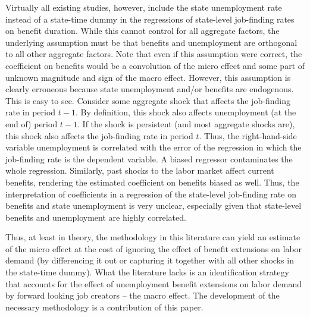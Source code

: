 \documentclass[12pt]{article}
\newcommand{\1}{\mathbf{1}}
\begin{document}
\begin{appendix}
Virtually all existing studies, however, include the state unemployment rate instead of a state-time dummy in the regressions of state-level job-finding rates on benefit duration. While this cannot control for all aggregate factors, the underlying assumption must be that benefits and unemployment are orthogonal to all other aggregate factors. Note that even if this assumption were correct, the coefficient on benefits would be a convolution of the micro effect and some part of unknown magnitude and sign of the macro effect. However, this assumption is clearly erroneous because state unemployment and/or benefits are endogenous. This is easy to see. Consider some aggregate shock that affects the job-finding rate in period $t-1$. By definition, this shock also affects unemployment (at the end of) period $t-1$. If the shock is persistent (and most aggregate shocks are), this shock also affects the job-finding rate in period $t$. Thus, the right-hand-side variable unemployment is correlated with the error of the regression in which the job-finding rate is the dependent variable. A biased regressor contaminates the whole regression. Similarly, past shocks to the labor market affect current benefits, rendering the estimated coefficient on benefits biased as well. Thus, the interpretation of coefficients in a regression of the state-level job-finding rate on benefits and state unemployment is very unclear, especially given that state-level benefits and unemployment are highly correlated.


Thus, at least in theory, the methodology in this literature can yield an estimate of the micro effect at the cost of ignoring the effect of benefit extensions on labor demand (by differencing it out or capturing it together with all other shocks in the state-time dummy). What the literature lacks is an identification strategy that accounts for the effect of unemployment benefit extensions on labor demand by forward looking job creators -- the macro effect. The development of the necessary methodology is a contribution of this paper.



\end{appendix}
\end{document}
